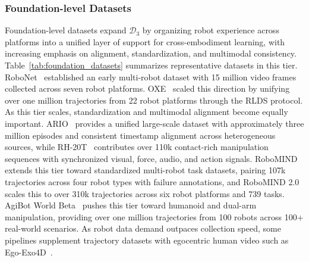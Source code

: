 \documentclass[acmsmall,screen,review]{acmart}
\begin{document}
\subsubsection{Foundation-level Datasets}\label{sec:foundation_datasets}

Foundation-level datasets expand \(\mathcal{D}_3\) by organizing robot experience across platforms into a unified layer of support for cross-embodiment learning, with increasing emphasis on alignment, standardization, and multimodal consistency.
Table~\ref{tab:foundation_datasets} summarizes representative datasets in this tier.
RoboNet~\cite{dasari2020robonet} established an early multi-robot dataset with 15 million video frames collected across seven robot platforms.
OXE~\cite{padalkar2023open} scaled this direction by unifying over one million trajectories from 22 robot platforms through the RLDS protocol.
As this tier scales, standardization and multimodal alignment become equally important.
ARIO~\cite{wang2024ario} provides a unified large-scale dataset with approximately three million episodes and consistent timestamp alignment across heterogeneous sources, while RH-20T~\cite{fang2023rh} contributes over 110k contact-rich manipulation sequences with synchronized visual, force, audio, and action signals.
RoboMIND~\cite{wu2025robomind} extends this tier toward standardized multi-robot task datasets, pairing 107k trajectories across four robot types with failure annotations, and RoboMIND 2.0~\cite{hou2026robomind20} scales this to over 310k trajectories across six robot platforms and 739 tasks.
AgiBot World Beta~\cite{agibot2025} pushes this tier toward humanoid and dual-arm manipulation, providing over one million trajectories from 100 robots across 100+ real-world scenarios.
As robot data demand outpaces collection speed, some pipelines supplement trajectory datasets with egocentric human video such as Ego-Exo4D~\cite{grauman2024egoexo4d}.
\end{document}
